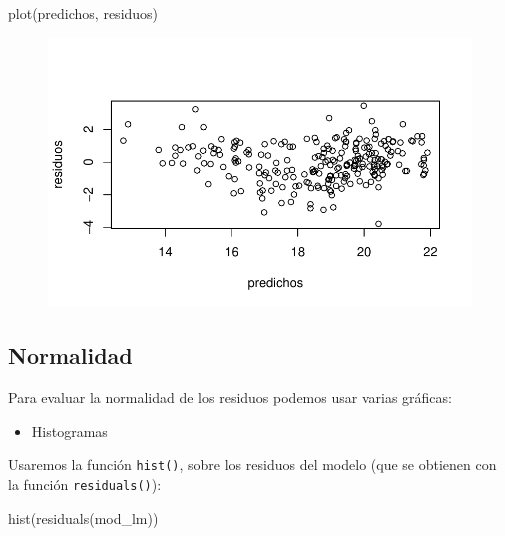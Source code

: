 \documentclass[
  letterpaper,
  DIV=11,
  numbers=noendperiod]{scrreprt}
\newenvironment{Shaded}{\begin{snugshade}}{\end{snugshade}}
\newcommand{\FunctionTok}[1]{\textcolor[rgb]{0.28,0.35,0.67}{#1}}
\newcommand{\NormalTok}[1]{\textcolor[rgb]{0.00,0.23,0.31}{#1}}
\providecommand{\tightlist}{%
  \setlength{\itemsep}{0pt}\setlength{\parskip}{0pt}}\usepackage{longtable,booktabs,array}
\begin{document}
\begin{Shaded}
\begin{Highlighting}[]
\FunctionTok{plot}\NormalTok{(predichos, residuos)}
\end{Highlighting}
\end{Shaded}

\begin{figure}[H]

{\centering \includegraphics{01_RegresionLineal_files/figure-pdf/unnamed-chunk-31-1.pdf}

}

\end{figure}

\hypertarget{normalidad}{%
\subsection{Normalidad}\label{normalidad}}

Para evaluar la normalidad de los residuos podemos usar varias gráficas:

\begin{itemize}
\tightlist
\item
  Histogramas
\end{itemize}

Usaremos la función \texttt{hist()}, sobre los residuos del modelo (que
se obtienen con la función \texttt{residuals()}):

\begin{Shaded}
\begin{Highlighting}[]
\FunctionTok{hist}\NormalTok{(}\FunctionTok{residuals}\NormalTok{(mod\_lm))}
\end{Highlighting}
\end{Shaded}
\end{document}
